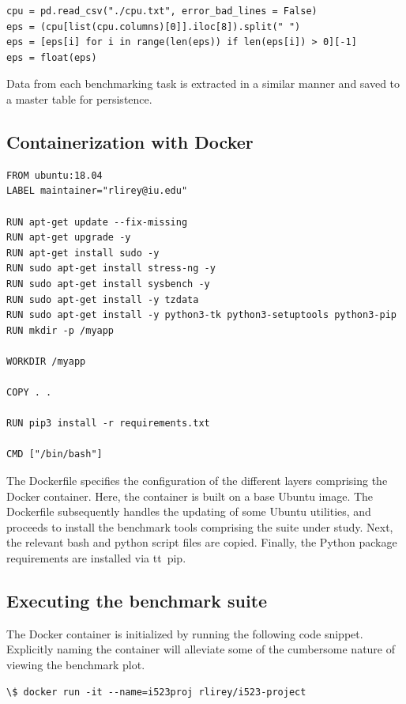 \documentclass[sigconf]{acmart}
\begin{document}
\begin{lstlisting}
cpu = pd.read_csv("./cpu.txt", error_bad_lines = False)
eps = (cpu[list(cpu.columns)[0]].iloc[8]).split(" ")
eps = [eps[i] for i in range(len(eps)) if len(eps[i]) > 0][-1]
eps = float(eps)
\end{lstlisting}

Data from each benchmarking task is extracted in a similar manner and saved to a master table for persistence.

\subsection{Containerization with Docker}

\begin{lstlisting}
FROM ubuntu:18.04
LABEL maintainer="rlirey@iu.edu"

RUN apt-get update --fix-missing
RUN apt-get upgrade -y
RUN apt-get install sudo -y
RUN sudo apt-get install stress-ng -y
RUN sudo apt-get install sysbench -y
RUN sudo apt-get install -y tzdata
RUN sudo apt-get install -y python3-tk python3-setuptools python3-pip
RUN mkdir -p /myapp

WORKDIR /myapp

COPY . .

RUN pip3 install -r requirements.txt

CMD ["/bin/bash"]
\end{lstlisting}

The Dockerfile specifies the configuration of the different layers comprising the Docker container. Here, the container is built on a base Ubuntu image. The Dockerfile subsequently handles the updating of some Ubuntu utilities, and proceeds to install the benchmark tools comprising the suite under study. Next, the relevant bash and python script files are copied. Finally, the Python package requirements are installed via {tt\ pip}.

\subsection{Executing the benchmark suite}
The Docker container is initialized by running the following code snippet. Explicitly naming the container will alleviate some of the cumbersome nature of viewing the benchmark plot.

\begin{lstlisting}
\$ docker run -it --name=i523proj rlirey/i523-project
\end{lstlisting}
\end{document}

